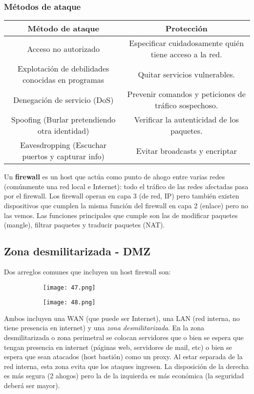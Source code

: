 \documentclass{book}
\begin{document}
	\subsubsection{Métodos de ataque}
	\begin{table}[H]
		\centering
		\begin{tabular}{|c|c|}
			\hline
			Método de ataque&Protección\\\hline
			Acceso no autorizado&Especificar cuidadosamente quién tiene acceso a la red.\\\hline
			Explotación de debilidades conocidas en programas &Quitar servicios vulnerables. \\\hline
			Denegación de servicio (DoS)&Prevenir comandos y peticiones de tráfico sospechoso. \\\hline
			Spoofing (Burlar pretendiendo otra identidad)&Verificar la autenticidad de los paquetes.\\\hline
			Eavesdropping (Escuchar puertos y capturar info)&Evitar broadcasts y encriptar\\\hline
		\end{tabular}
	\end{table}
	
	Un \textbf{firewall} es un host que actúa como punto de ahogo entre varias redes (comúnmente una red local e Internet): todo el tráfico de las redes afectadas pasa por el firewall. Los firewall operan en capa 3 (de red, IP) pero también existen dispositivos que cumplen la misma función del firewall en capa 2 (enlace) pero no las vemos. Las funciones principales que cumple son las de modificar paquetes (mangle), filtrar paquetes y traducir paquetes (NAT).
	
	\subsection{Zona desmilitarizada - DMZ}
	Dos arreglos comunes que incluyen un host firewall son:
	
	\begin{figure}[H]
		\centering
		\begin{subfigure}{0.4\textwidth}
			\centering
			\texttt{[image: 47.png]}
		\end{subfigure}
		\qquad
		\begin{subfigure}{0.4\textwidth}
			\centering
			\texttt{[image: 48.png]}
		\end{subfigure}
	\end{figure}
	
	Ambos incluyen una WAN (que puede ser Internet), una LAN (red interna, no tiene presencia en internet) y una \textit{zona desmilitarizada}. En la zona desmilitarizada o zona perimetral se colocan servidores que o bien se espera que tengan presencia en internet (páginas web, servidores de mail, etc) o bien se espera que sean atacados (host bastión) como un proxy. Al estar separada de la red interna, esta zona evita que los ataques ingresen. La disposición de la derecha es más segura (2 ahogos) pero la de la izquierda es más económica (la seguridad deberá ser mayor).
	
\end{document}
